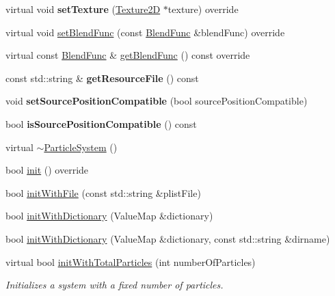 \begin{DoxyCompactItemize}
\mbox{\label{classParticleSystem_ad0567b7b53b47481455792a6ac5ba5ac}} 
virtual void {\bfseries set\+Texture} (\hyperlink{classTexture2D}{Texture2D} $\ast$texture) override
\item 
virtual void \hyperlink{classParticleSystem_abac3b3d6d4bd98bbeb23efa1b339343c}{set\+Blend\+Func} (const \hyperlink{structBlendFunc}{Blend\+Func} \&blend\+Func) override
\item 
virtual const \hyperlink{structBlendFunc}{Blend\+Func} \& \hyperlink{classParticleSystem_aa34df627c4e7fdc9f0b76713afd77b96}{get\+Blend\+Func} () const override
\item 
\mbox{\label{classParticleSystem_ad37055b7a3a6a3afd82f07d3a0a03b8c}} 
const std\+::string \& {\bfseries get\+Resource\+File} () const
\item 
\mbox{\label{classParticleSystem_aab09faf7d1e4614d68a5e67b1cc77a50}} 
void {\bfseries set\+Source\+Position\+Compatible} (bool source\+Position\+Compatible)
\item 
\mbox{\label{classParticleSystem_a418ed99da5ece3c3cfc1791c5479a294}} 
bool {\bfseries is\+Source\+Position\+Compatible} () const
\item 
virtual \hyperlink{classParticleSystem_a3745e42099638f5abf9b924a81ad0d23}{$\sim$\+Particle\+System} ()
\item 
bool \hyperlink{classParticleSystem_a65c05b30432f6e8aeb45ba018f3a8d3f}{init} () override
\item 
bool \hyperlink{classParticleSystem_ae7ac29438534c33f71f36502b75a2c62}{init\+With\+File} (const std\+::string \&plist\+File)
\item 
bool \hyperlink{classParticleSystem_aac8d437cf5d04b3dcc803ffeb1a159f3}{init\+With\+Dictionary} (Value\+Map \&dictionary)
\item 
bool \hyperlink{classParticleSystem_af9ea32fce54ca0962029e64e9558aded}{init\+With\+Dictionary} (Value\+Map \&dictionary, const std\+::string \&dirname)
\item 
\mbox{\label{classParticleSystem_ac3d5dc8a1734c434e25cdb4d624850fc}} 
virtual bool \hyperlink{classParticleSystem_ac3d5dc8a1734c434e25cdb4d624850fc}{init\+With\+Total\+Particles} (int number\+Of\+Particles)
\begin{DoxyCompactList}\small\item\em Initializes a system with a fixed number of particles. \end{DoxyCompactList}\item 

\end{DoxyCompactItemize}
